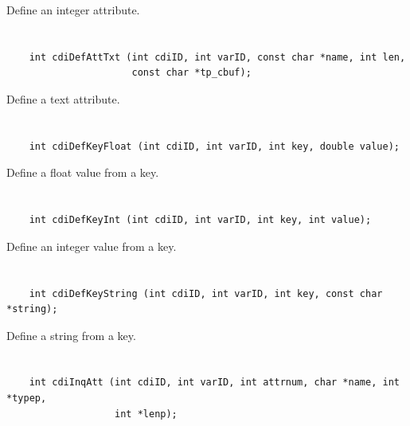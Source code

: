 Define an integer attribute.


\section*{\tt {}}

\begin{verbatim}
    int cdiDefAttTxt (int cdiID, int varID, const char *name, int len,
                      const char *tp_cbuf);
\end{verbatim}

Define a text attribute.


\section*{\tt {}}

\begin{verbatim}
    int cdiDefKeyFloat (int cdiID, int varID, int key, double value);
\end{verbatim}

Define a float value from a key.


\section*{\tt {}}

\begin{verbatim}
    int cdiDefKeyInt (int cdiID, int varID, int key, int value);
\end{verbatim}

Define an integer value from a key.


\section*{\tt {}}

\begin{verbatim}
    int cdiDefKeyString (int cdiID, int varID, int key, const char *string);
\end{verbatim}

Define a string from a key.


\section*{\tt {}}

\begin{verbatim}
    int cdiInqAtt (int cdiID, int varID, int attrnum, char *name, int *typep,
                   int *lenp);
\end{verbatim}

